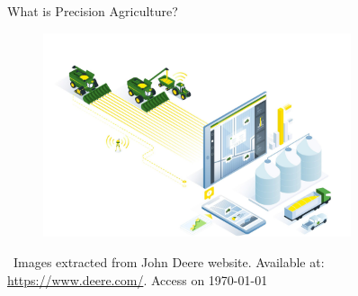 \documentclass[xcolor=table]{beamer}
\begin{document}
\begin{frame}{ \normalsize What is Precision Agriculture?}

	\begin{figure}[htb]
		\centering
		\includegraphics[height=6cm]{figs/precisionag.jpg}
		\label{fig:precisionAgriculture}
	\end{figure}
	
	~\flushright \tiny {Images extracted from John Deere website. Available at: \url{https://www.deere.com/}. Access on \today}
	
\end{frame}
\end{document}
